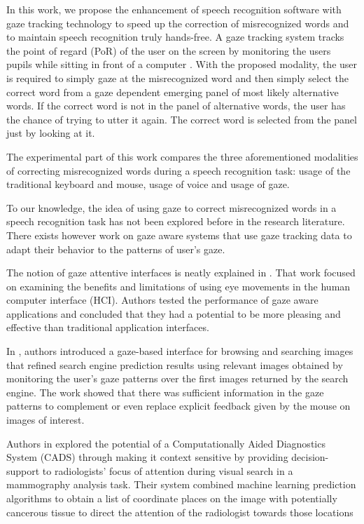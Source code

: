 \documentclass[]{article}
\begin{document}
 
In this work, we propose the enhancement of speech recognition software with gaze tracking technology to speed up the
correction of misrecognized words and to maintain speech recognition truly hands-free. A gaze tracking system tracks the
point of regard (PoR) of the user on the screen by monitoring the users pupils while sitting in front of a computer
\cite{Rozado2012a}. With the proposed modality, the user is required to simply gaze at the misrecognized word and then
simply select the correct word from a gaze dependent emerging panel of most likely alternative words. If the correct
word is not in the panel of alternative words, the user has the chance of trying to utter it again. The correct word is
selected from the panel just by looking at it.


The experimental part of this work compares the three aforementioned modalities of correcting misrecognized words during
 a speech recognition task: usage of the traditional keyboard and mouse, usage of voice and usage of gaze.


To our knowledge, the idea of using gaze to correct misrecognized words in a speech recognition task has not been 
explored before in the research literature. There exists however work on gaze aware systems that use gaze tracking data
to adapt their behavior to the patterns of user's gaze.


The notion of gaze attentive interfaces is neatly explained in \cite{hyrskykari2006eyes}. That work focused on examining
the benefits and limitations of using eye movements in the human computer interface (HCI). Authors tested 
the performance of gaze aware applications and concluded that they had a potential to be more
pleasing and effective than traditional application interfaces.

 
In \cite{Kozma2009}, authors introduced a gaze-based interface for browsing and searching images that refined search
engine prediction results using relevant images obtained by monitoring the user's gaze patterns over the first images
returned by the search engine. The work showed that there was sufficient information in the gaze patterns to complement
or even replace explicit feedback given by the mouse on images of interest.


Authors in \cite{Tourassi2010} explored the potential of a Computationally Aided Diagnostics System (CADS) through
making it context sensitive by providing decision-support to radiologists' focus of attention during visual search
in a mammography analysis task. Their system combined machine learning prediction algorithms to obtain a list of
coordinate places on the image with potentially cancerous tissue to direct the attention of the radiologist towards
those locations
\end{document}
